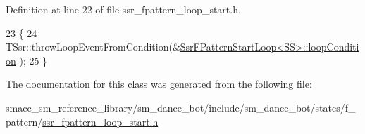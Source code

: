 Definition at line 22 of file ssr\+\_\+fpattern\+\_\+loop\+\_\+start.\+h.


\begin{DoxyCode}
23   \{
24     TSsr::throwLoopEventFromCondition(&\hyperlink{structfpattern__substates_1_1SsrFPatternStartLoop_ad2f12b54210a5cd30ac057a95bf35dfa}{SsrFPatternStartLoop<SS>::loopCondition}
      );
25   \}
\end{DoxyCode}


The documentation for this class was generated from the following file\+:\begin{DoxyCompactItemize}
\item 
smacc\+\_\+sm\+\_\+reference\+\_\+library/sm\+\_\+dance\+\_\+bot/include/sm\+\_\+dance\+\_\+bot/states/f\+\_\+pattern/\hyperlink{ssr__fpattern__loop__start_8h}{ssr\+\_\+fpattern\+\_\+loop\+\_\+start.\+h}\end{DoxyCompactItemize}
